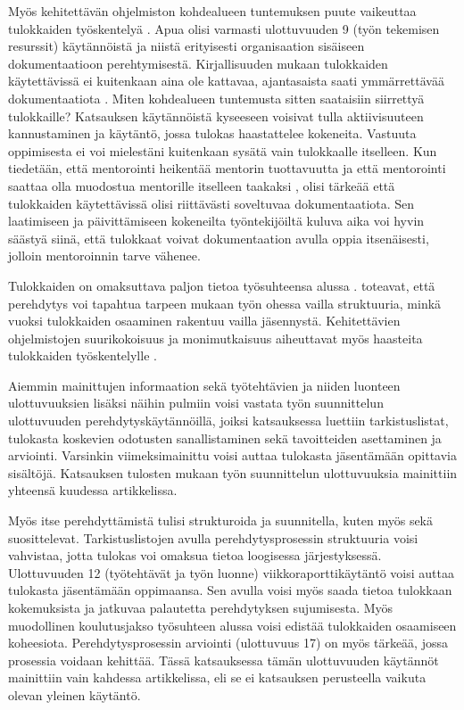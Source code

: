 \documentclass[utf8]{gradu3}
\begin{document}
Myös kehitettävän ohjelmiston kohdealueen tuntemuksen puute vaikeuttaa tulokkaiden työskentelyä %
\parencites%
    {matturro-ym-2017}%
    {dagenais-ym-2010}%
\relax
% 
. Apua olisi varmasti ulottuvuuden 9 (työn tekemisen resurssit) käytännöistä ja niistä erityisesti organisaation sisäiseen dokumentaatioon perehtymisestä. Kirjallisuuden mukaan tulokkaiden käytettävissä ei kuitenkaan aina ole kattavaa, ajantasaista saati ymmärrettävää dokumentaatiota %
\parencites%
    {matturro-ym-2017}%
    {dagenais-ym-2010}%
    {begel-simon-2008}%
\relax
%
. Miten kohdealueen tuntemusta sitten saataisiin siirrettyä tulokkaille? Katsauksen käytännöistä kyseeseen voisivat tulla aktiivisuuteen kannustaminen ja käytäntö, jossa tulokas haastattelee kokeneita. Vastuuta oppimisesta ei voi mielestäni kuitenkaan sysätä vain tulokkaalle itselleen. Kun tiedetään, että mentorointi heikentää mentorin tuottavuutta \parencite{medeiros-2021} ja että mentorointi saattaa olla muodostua mentorille itselleen taakaksi \parencite{viviani-murphy-2019}, olisi tärkeää että tulokkaiden käytettävissä olisi riittävästi soveltuvaa dokumentaatiota. Sen laatimiseen ja päivittämiseen kokeneilta työntekijöiltä kuluva aika voi hyvin säästyä siinä, että tulokkaat voivat dokumentaation avulla oppia itsenäisesti, jolloin mentoroinnin tarve vähenee.

Tulokkaiden on omaksuttava paljon tietoa työsuhteensa alussa \parencite{dagenais-ym-2010}. \textcite{begel-simon-2008} toteavat, että perehdytys voi tapahtua tarpeen mukaan työn ohessa vailla struktuuria, minkä vuoksi tulokkaiden osaaminen rakentuu vailla jäsennystä. Kehitettävien ohjelmistojen suurikokoisuus ja monimutkaisuus aiheuttavat myös haasteita tulokkaiden työskentelylle %
\parencites%
    {craig-ym-2018}%
    {britto-ym-2019}%
\relax
% 
.

Aiemmin mainittujen informaation sekä työtehtävien ja niiden luonteen ulottuvuuksien lisäksi näihin pulmiin voisi vastata työn suunnittelun ulottuvuuden perehdytyskäytännöillä, joiksi katsauksessa luettiin tarkistuslistat, tulokasta koskevien odotusten sanallistaminen sekä tavoitteiden asettaminen ja arviointi. Varsinkin viimeksimainittu voisi auttaa tulokasta jäsentämään opittavia sisältöjä. Katsauksen tulosten mukaan työn suunnittelun ulottuvuuksia mainittiin yhteensä kuudessa artikkelissa.

Myös itse perehdyttämistä tulisi strukturoida ja suunnitella, kuten myös \textcite{britto-ym-2020} sekä \textcite{hemphill-begel-2011} suosittelevat. Tarkistuslistojen avulla perehdytysprosessin struktuuria voisi vahvistaa, jotta tulokas voi omaksua tietoa loogisessa järjestyksessä. Ulottuvuuden 12 (työtehtävät ja työn luonne) viikkoraporttikäytäntö voisi auttaa tulokasta jäsentämään oppimaansa. Sen avulla voisi myös saada tietoa tulokkaan kokemuksista ja jatkuvaa palautetta perehdytyksen sujumisesta. Myös muodollinen koulutusjakso työsuhteen alussa voisi edistää tulokkaiden osaamiseen koheesiota. Perehdytysprosessin arviointi (ulottuvuus 17) on myös tärkeää, jossa prosessia voidaan kehittää. Tässä katsauksessa tämän ulottuvuuden käytännöt mainittiin vain kahdessa artikkelissa, eli se ei katsauksen perusteella vaikuta olevan yleinen käytäntö.
\end{document}
